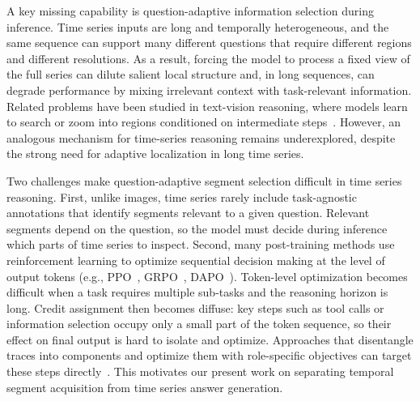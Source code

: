 A key missing capability is question-adaptive information selection during inference. Time series inputs are long and temporally heterogeneous, and the same sequence can support many different questions that require different regions and different resolutions. As a result, forcing the model to process a fixed view of the full series can dilute salient local structure and, in long sequences, can degrade performance by mixing irrelevant context with task-relevant information. Related problems have been studied in text-vision reasoning, where models learn to search or zoom into regions conditioned on intermediate steps~\cite{wang2025pixel,zhang2025chain,li2025imagine}. However, an analogous mechanism for time-series reasoning remains underexplored, despite the strong need for adaptive localization in long  time series.

Two challenges make question-adaptive segment selection difficult in time series reasoning. First, unlike images, time series rarely include task-agnostic annotations that identify segments relevant to a given question. Relevant segments depend on the question, so the model must decide during inference which parts of time series to inspect.
Second, many post-training methods use reinforcement learning to optimize sequential decision making at the level of output tokens (e.g., PPO~\cite{schulman2017ppo}, GRPO~\cite{shao2024deepseekmath}, DAPO~\cite{yu2025dapo}). Token-level optimization becomes difficult when a task requires multiple sub-tasks and the reasoning horizon is long. Credit assignment then becomes diffuse: key steps such as tool calls or information selection occupy only a small part of the token sequence, so their effect on final output is hard to isolate and optimize. Approaches that disentangle traces into components and optimize them with role-specific objectives can target these steps directly~\cite{klissarov2025hrl}. This motivates our present work on separating temporal segment acquisition from time series answer generation.

